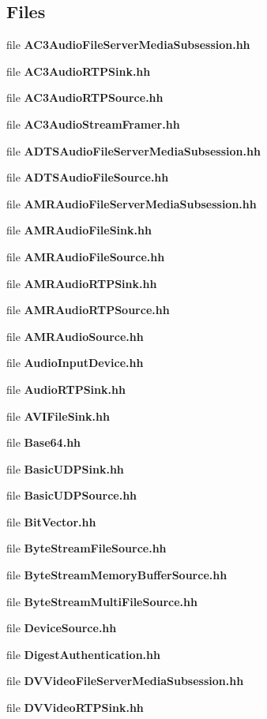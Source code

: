 \subsection*{Files}
\begin{DoxyCompactItemize}
\item 
file {\bf A\+C3\+Audio\+File\+Server\+Media\+Subsession.\+hh}
\item 
file {\bf A\+C3\+Audio\+R\+T\+P\+Sink.\+hh}
\item 
file {\bf A\+C3\+Audio\+R\+T\+P\+Source.\+hh}
\item 
file {\bf A\+C3\+Audio\+Stream\+Framer.\+hh}
\item 
file {\bf A\+D\+T\+S\+Audio\+File\+Server\+Media\+Subsession.\+hh}
\item 
file {\bf A\+D\+T\+S\+Audio\+File\+Source.\+hh}
\item 
file {\bf A\+M\+R\+Audio\+File\+Server\+Media\+Subsession.\+hh}
\item 
file {\bf A\+M\+R\+Audio\+File\+Sink.\+hh}
\item 
file {\bf A\+M\+R\+Audio\+File\+Source.\+hh}
\item 
file {\bf A\+M\+R\+Audio\+R\+T\+P\+Sink.\+hh}
\item 
file {\bf A\+M\+R\+Audio\+R\+T\+P\+Source.\+hh}
\item 
file {\bf A\+M\+R\+Audio\+Source.\+hh}
\item 
file {\bf Audio\+Input\+Device.\+hh}
\item 
file {\bf Audio\+R\+T\+P\+Sink.\+hh}
\item 
file {\bf A\+V\+I\+File\+Sink.\+hh}
\item 
file {\bf Base64.\+hh}
\item 
file {\bf Basic\+U\+D\+P\+Sink.\+hh}
\item 
file {\bf Basic\+U\+D\+P\+Source.\+hh}
\item 
file {\bf Bit\+Vector.\+hh}
\item 
file {\bf Byte\+Stream\+File\+Source.\+hh}
\item 
file {\bf Byte\+Stream\+Memory\+Buffer\+Source.\+hh}
\item 
file {\bf Byte\+Stream\+Multi\+File\+Source.\+hh}
\item 
file {\bf Device\+Source.\+hh}
\item 
file {\bf Digest\+Authentication.\+hh}
\item 
file {\bf D\+V\+Video\+File\+Server\+Media\+Subsession.\+hh}
\item 
file {\bf D\+V\+Video\+R\+T\+P\+Sink.\+hh}

\end{DoxyCompactItemize}
